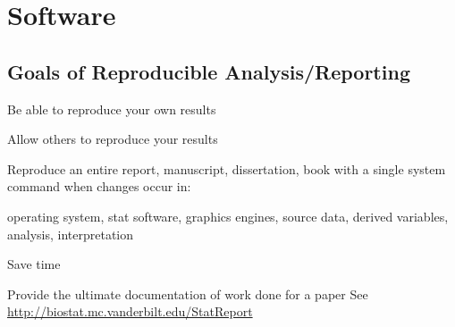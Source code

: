 \section{Software}
\subsection{Goals of Reproducible Analysis/Reporting}
\bi
\item Be able to reproduce your own results
\item Allow others to reproduce your results

\item Reproduce an entire report, manuscript, dissertation, book with
a single system command when changes occur in:
 \bi
 \item operating system, stat software, graphics engines, source data, derived
 variables, analysis, interpretation
 \ei
\item Save time
\item Provide the ultimate documentation of work done for a paper
\ei
See \url{http://biostat.mc.vanderbilt.edu/StatReport}

